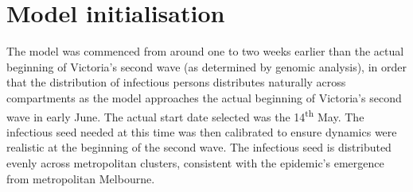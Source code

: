 \section{Model initialisation}
The model was commenced from around one to two weeks earlier than the actual beginning of Victoria's second wave (as determined by genomic analysis), in order that the distribution of infectious persons distributes naturally across compartments as the model approaches the actual beginning of Victoria's second wave in early June. The actual start date selected was the 14\textsuperscript{th} May. The infectious seed needed at this time was then calibrated to ensure dynamics were realistic at the beginning of the second wave. The infectious seed is distributed evenly across metropolitan clusters, consistent with the epidemic's emergence from metropolitan Melbourne.